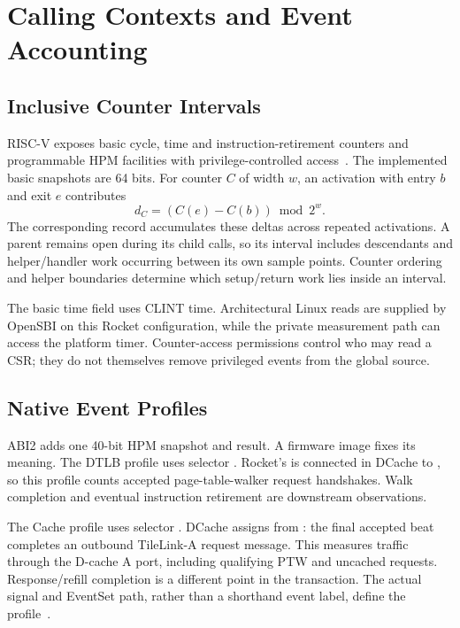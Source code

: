\section{Calling Contexts and Event Accounting}
\label{sec:accounting}
\subsection{Inclusive Counter Intervals}
RISC-V exposes basic cycle, time and instruction-retirement counters and programmable HPM facilities with privilege-controlled access~\citep{riscvpriv,riscvunpriv}. The implemented basic snapshots are 64 bits. For counter $C$ of width $w$, an activation with entry $b$ and exit $e$ contributes
\begin{equation}
 d_C=(C(e)-C(b))\bmod 2^w.
\label{eq:interval}
\end{equation}
The corresponding record accumulates these deltas across repeated activations. A parent remains open during its child calls, so its interval includes descendants and helper/handler work occurring between its own sample points. Counter ordering and helper boundaries determine which setup/return work lies inside an interval.

The basic time field uses CLINT time. Architectural Linux  reads are supplied by OpenSBI on this Rocket configuration, while the private measurement path can access the platform timer. Counter-access permissions control who may read a CSR; they do not themselves remove privileged events from the global source.

\subsection{Native Event Profiles}
ABI2 adds one 40-bit HPM snapshot and result. A firmware image fixes its meaning. The DTLB profile uses selector . Rocket's  is connected in DCache to , so this profile counts accepted page-table-walker request handshakes. Walk completion and eventual instruction retirement are downstream observations.

The Cache profile uses selector . DCache assigns  from : the final accepted beat completes an outbound TileLink-A request message. This measures traffic through the D-cache A port, including qualifying PTW and uncached requests. Response/refill completion is a different point in the transaction. The actual signal and EventSet path, rather than a shorthand event label, define the profile~\citep{rocketimpl}.

